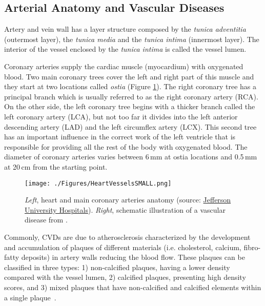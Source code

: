 \subsection{Arterial Anatomy and Vascular Diseases}
%

Artery and vein wall has a layer structure composed by the \textit{tunica adventitia} (outermost layer), the \textit{tunica media} and the \textit{tunica intima} (innermost layer). The interior of the vessel enclosed by the \textit{tunica intima} is called the vessel lumen.

Coronary arteries supply the cardiac muscle (myocardium) with oxygenated blood. Two main coronary trees cover the left and right part of this muscle and they start at two locations called \textit{ostia} (Figure \ref{fig:HeartVessels}). The right coronary tree has a principal branch which is usually referred to as the right coronary artery (RCA). On the other side, the left coronary tree begins with a thicker branch called the left coronary artery (LCA), but not too far it divides into the left anterior descending artery (LAD) and the left circumflex artery (LCX). This second tree has an important influence in the correct work of the left ventricle that is responsible for providing all the rest of the body with oxygenated blood. The diameter of coronary arteries varies between 6{\,}mm at ostia locations and 0.5{\,}mm at 20{\,}cm from the starting point.

\begin{figure}[ht]
	\centering
		\texttt{[image: ./Figures/HeartVesselsSMALL.png]}
	\caption[Coronary arteries anatomy and diseases]{\textit{Left}, heart and main coronary arteries anatomy (source: \href{http://www.jeffersonhospital.org/
Tests-and-Treatments/coronary-artery-bypass-grafting.aspx}{Jefferson University Hospitals}). \textit{Right}, schematic illustration of a vascular disease from \citep{Schaap2010Thesis}.}
	\label{fig:HeartVessels}
\end{figure}

Commonly, CVDs are due to atherosclerosis characterized by the development and accumulation of plaques of different materials (i.e. cholesterol, calcium, fibro-fatty deposits) in artery walls reducing the blood flow. These plaques can be classified in three types: 1) non-calcified plaques, having a lower density compared with the vessel lumen, 2) calcified plaques, presenting high density scores, and 3) mixed plaques that have non-calcified and calcified elements within a single plaque~\citep{Pundziute2007}.

